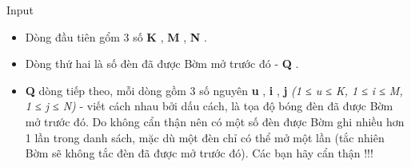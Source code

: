 Input
\begin{itemize}
	\item Dòng đầu tiên gổm 3 số \textbf{ K } , \textbf{ M } , \textbf{ N } .
	\item Dòng thứ hai là số đèn đã được Bờm mở trước đó - \textbf{ Q } .
	\item \textbf{Q } dòng tiếp theo, mỗi dòng gồm 3 số nguyên \textbf{ u } , \textbf{ i } , \textbf{ j }\emph{ (1 ≤ u ≤ K, 1 ≤ i ≤ M, 1 ≤ j ≤ N) } - viết cách nhau bởi dấu cách, là tọa độ bóng đèn đã được Bờm mở trước đó. Do không cẩn thận nên có một số đèn được Bờm ghi nhiều hơn 1 lần trong danh sách, mặc dù một đèn chỉ có thể mở một lần (tắc nhiên Bờm sẽ không tắc đèn đã được mở trước đó). Các bạn hãy cẩn thận !!!
\end{itemize}